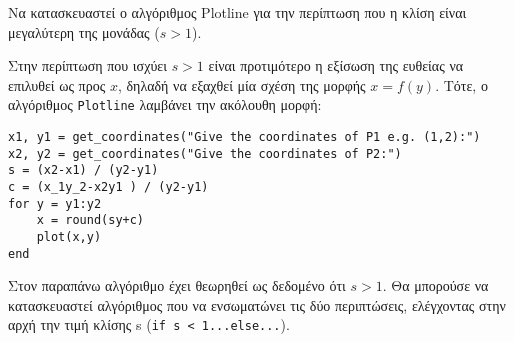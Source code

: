 \begin{exercise}

Να κατασκευαστεί ο αλγόριθμος Plotline για την περίπτωση που η κλίση είναι μεγαλύτερη της μονάδας ($s>1$).
\end{exercise}

\begin{solution}
	
Στην περίπτωση που ισχύει $s >1$ είναι προτιμότερο η εξίσωση της ευθείας να επιλυθεί ως προς $x$, δηλαδή να εξαχθεί μία σχέση της μορφής $x = f (y)$. Τότε, ο αλγόριθμος \texttt{Plotline} λαμβάνει την ακόλουθη μορφή:
	
	
\begin{lstlisting} 
x1, y1 = get_coordinates("Give the coordinates of P1 e.g. (1,2):")
x2, y2 = get_coordinates("Give the coordinates of P2:")
s = (x2-x1) / (y2-y1)
c = (x_1y_2-x2y1 ) / (y2-y1)
for y = y1:y2
	x = round(sy+c) 
	plot(x,y)
end
\end{lstlisting}

Στον παραπάνω αλγόριθμο έχει θεωρηθεί ως δεδομένο ότι $s > 1$. Θα μπορούσε να κατασκευαστεί αλγόριθμος που να ενσωματώνει τις δύο περιπτώσεις, ελέγχοντας στην αρχή την τιμή κλίσης s (\texttt{if s < 1...else...}).


\end{solution}
